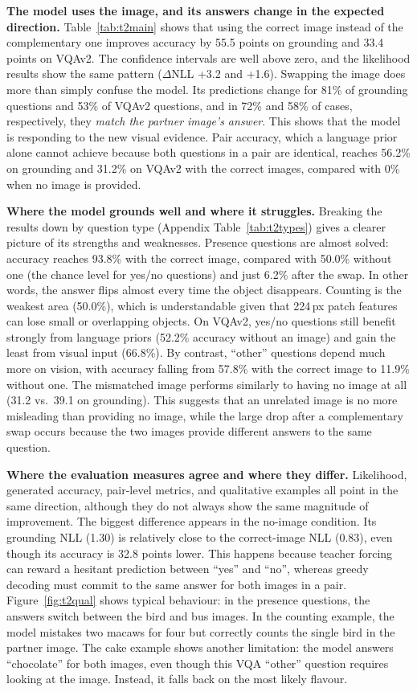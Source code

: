 \documentclass{article}
\begin{document}
\textbf{The model uses the image, and its answers change in the expected direction.} Table~\ref{tab:t2main} shows that using the correct image instead of the complementary one improves accuracy by 55.5 points on grounding and 33.4 points on VQAv2. The confidence intervals are well above zero, and the likelihood results show the same pattern ($\Delta$NLL +3.2 and +1.6). Swapping the image does more than simply confuse the model. Its predictions change for 81\% of grounding questions and 53\% of VQAv2 questions, and in 72\% and 58\% of cases, respectively, they \emph{match the partner image's answer}. This shows that the model is responding to the new visual evidence. Pair accuracy, which a language prior alone cannot achieve because both questions in a pair are identical, reaches 56.2\% on grounding and 31.2\% on VQAv2 with the correct images, compared with 0\% when no image is provided.

\textbf{Where the model grounds well and where it struggles.} Breaking the results down by question type (Appendix Table~\ref{tab:t2types}) gives a clearer picture of its strengths and weaknesses. Presence questions are almost solved: accuracy reaches 93.8\% with the correct image, compared with 50.0\% without one (the chance level for yes/no questions) and just 6.2\% after the swap. In other words, the answer flips almost every time the object disappears. Counting is the weakest area (50.0\%), which is understandable given that 224\,px patch features can lose small or overlapping objects. On VQAv2, yes/no questions still benefit strongly from language priors (52.2\% accuracy without an image) and gain the least from visual input (66.8\%). By contrast, ``other'' questions depend much more on vision, with accuracy falling from 57.8\% with the correct image to 11.9\% without one. The mismatched image performs similarly to having no image at all (31.2 vs.\ 39.1 on grounding). This suggests that an unrelated image is no more misleading than providing no image, while the large drop after a complementary swap occurs because the two images provide different answers to the same question.

\textbf{Where the evaluation measures agree and where they differ.} Likelihood, generated accuracy, pair-level metrics, and qualitative examples all point in the same direction, although they do not always show the same magnitude of improvement. The biggest difference appears in the no-image condition. Its grounding NLL (1.30) is relatively close to the correct-image NLL (0.83), even though its accuracy is 32.8 points lower. This happens because teacher forcing can reward a hesitant prediction between ``yes'' and ``no'', whereas greedy decoding must commit to the same answer for both images in a pair. Figure~\ref{fig:t2qual} shows typical behaviour: in the presence questions, the answers switch between the bird and bus images. In the counting example, the model mistakes two macaws for four but correctly counts the single bird in the partner image. The cake example shows another limitation: the model answers ``chocolate'' for both images, even though this VQA ``other'' question requires looking at the image. Instead, it falls back on the most likely flavour.
\end{document}
